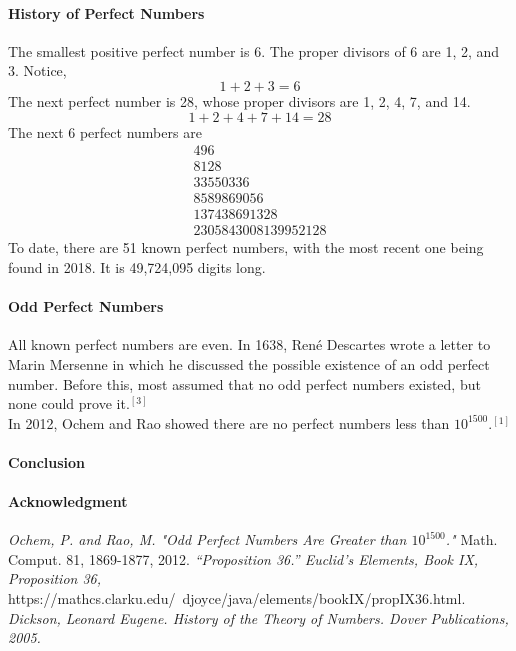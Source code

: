 \documentclass[12pt]{article}
\begin{document}
\paragraph*{History of Perfect Numbers}
The smallest positive perfect number is 6. The proper divisors of 6 are 1, 2, and 3. Notice, $$1+2+3=6$$
The next perfect number is 28, whose proper divisors are 1, 2, 4, 7, and 14.
$$1+2+4+7+14=28$$
The next 6 perfect numbers are
 $$\begin{array}{r}
496\\
8128\\
33550336\\
8589869056\\
137438691328\\
2305843008139952128
\end{array}$$
To date, there are 51 known perfect numbers, with the most recent one being found in 2018. It is 49,724,095 digits long.
\paragraph*{Odd Perfect Numbers}
All known perfect numbers are even. In 1638, René Descartes wrote a letter to Marin Mersenne in which he discussed the possible existence of an odd perfect number. Before this, most assumed that no odd perfect numbers existed, but none could prove it.$^{[3]}$ \\
In 2012, Ochem and Rao showed there are no perfect numbers less than $10^{1500}$.$^{[1]}$

\paragraph*{Conclusion}

\paragraph*{Acknowledgment}


\begin{thebibliography}{5}
\textit{Ochem, P. and Rao, M. "Odd Perfect Numbers Are Greater than $10^{1500}$."} Math. Comput. 81, 1869-1877, 2012.
\textit{“Proposition 36.” Euclid's Elements, Book IX, Proposition 36,} https://mathcs.clarku.edu/~djoyce/java/elements/bookIX/propIX36.html.
\textit{Dickson, Leonard Eugene. History of the Theory of Numbers. Dover Publications, 2005.}
\end{thebibliography}
\end{document}
